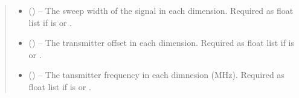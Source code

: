 \documentclass[letterpaper,10pt,english]{sphinxmanual}
\begin{document}
\begin{fulllineitems}
\begin{quote}
\begin{description}
\begin{itemize}
\item {} 
\sphinxAtStartPar
{} (\sphinxstyleliteralemphasis{\sphinxupquote{{[}}}\sphinxstyleliteralemphasis{\sphinxupquote{{]}}}\sphinxstyleliteralemphasis{\sphinxupquote{, }}\sphinxstyleliteralemphasis{\sphinxupquote{{[}}}\sphinxstyleliteralemphasis{\sphinxupquote{, }}\sphinxstyleliteralemphasis{\sphinxupquote{{]} or }}\sphinxstyleliteralemphasis{\sphinxupquote{, }}) – The sweep width of the signal in each dimension. Required as float
list if  is  or .

\item {} 
\sphinxAtStartPar
{} (\sphinxstyleliteralemphasis{\sphinxupquote{{[}}}\sphinxstyleliteralemphasis{\sphinxupquote{{]}}}\sphinxstyleliteralemphasis{\sphinxupquote{, }}\sphinxstyleliteralemphasis{\sphinxupquote{{[}}}\sphinxstyleliteralemphasis{\sphinxupquote{, }}\sphinxstyleliteralemphasis{\sphinxupquote{{]} or }}\sphinxstyleliteralemphasis{\sphinxupquote{, }}) – The transmitter offset in each dimension. Required as float
list if  is  or .

\item {} 
\sphinxAtStartPar
{} (\sphinxstyleliteralemphasis{\sphinxupquote{{[}}}\sphinxstyleliteralemphasis{\sphinxupquote{{]}}}\sphinxstyleliteralemphasis{\sphinxupquote{, }}\sphinxstyleliteralemphasis{\sphinxupquote{{[}}}\sphinxstyleliteralemphasis{\sphinxupquote{, }}\sphinxstyleliteralemphasis{\sphinxupquote{{]} or }}\sphinxstyleliteralemphasis{\sphinxupquote{, }}) – The tansmitter frequency in each dimnesion (MHz). Required as float
list if  is  or .


\end{itemize}
\end{description}
\end{quote}
\end{fulllineitems}
\end{document}
